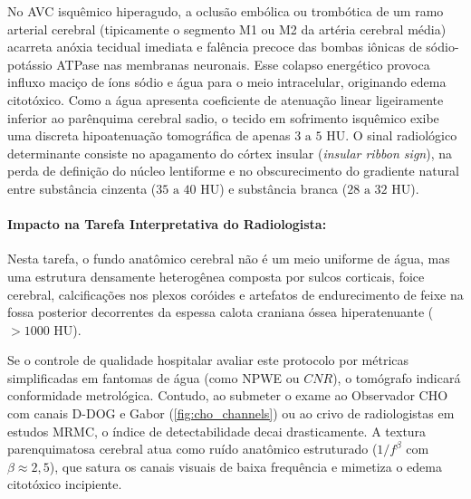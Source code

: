 \documentclass[
  12pt,
  a4paper,
  oneside
]{report}
\begin{document}
No AVC isquêmico hiperagudo, a oclusão embólica ou trombótica de um ramo arterial cerebral (tipicamente o segmento M1 ou M2 da artéria cerebral média) acarreta anóxia tecidual imediata e falência precoce das bombas iônicas de sódio-potássio ATPase nas membranas neuronais. Esse colapso energético provoca influxo maciço de íons sódio e água para o meio intracelular, originando edema citotóxico. Como a água apresenta coeficiente de atenuação linear ligeiramente inferior ao parênquima cerebral sadio, o tecido em sofrimento isquêmico exibe uma discreta hipoatenuação tomográfica de apenas $3\text{ a } 5\text{ HU}$. O sinal radiológico determinante consiste no apagamento do córtex insular (\emph{insular ribbon sign}), na perda de definição do núcleo lentiforme e no obscurecimento do gradiente natural entre substância cinzenta ($35\text{ a } 40\text{ HU}$) e substância branca ($28\text{ a } 32\text{ HU}$).

\paragraph{Impacto na Tarefa Interpretativa do Radiologista:} Nesta tarefa, o fundo anatômico cerebral não é um meio uniforme de água, mas uma estrutura densamente heterogênea composta por sulcos corticais, foice cerebral, calcificações nos plexos coróides e artefatos de endurecimento de feixe na fossa posterior decorrentes da espessa calota craniana óssea hiperatenuante ($> 1000\text{ HU}$). 

Se o controle de qualidade hospitalar avaliar este protocolo por métricas simplificadas em fantomas de água (como NPWE ou $CNR$), o tomógrafo indicará conformidade metrológica. Contudo, ao submeter o exame ao Observador CHO com canais D-DOG e Gabor (\cref{fig:cho_channels}) ou ao crivo de radiologistas em estudos MRMC, o índice de detectabilidade decai drasticamente. A textura parenquimatosa cerebral atua como ruído anatômico estruturado ($1/f^\beta$ com $\beta \approx 2{,}5$), que satura os canais visuais de baixa frequência e mimetiza o edema citotóxico incipiente.
\end{document}

